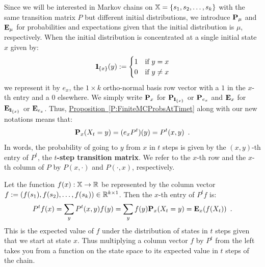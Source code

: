 Since we will be interested in Markov chains on $\mathbb{X} =\{s_1,s_2,\ldots,s_k\}$ with the same transition matrix $P$ but different initial distributions, we introduce $\mathbf{P}_{\mu}$ and $\mathbf{E}_{\mu}$ for probabilities and expectations  given that the initial distribution is $\mu$, respectively.  When the initial distribution is concentrated at a single initial state $x$ given by:
$${1}\mspace{-11 mu}{1}_{\{x\}}(y) := \begin{cases} 1 & \text{if } y=x\\ 0 & \text{if } y \neq x \end{cases}$$ 
we represent it by $e_x$, the $1 \times k$ ortho-normal basis row vector with a $1$ in the $x$-th entry and a $0$ elsewhere.  
We simply write $\mathbf{P}_x$ for $\mathbf{P}_{{1}\mspace{-11 mu}{1}_{\{x\}}}$ or $\mathbf{P}_{e_x}$ and $\mathbf{E}_x$ for $\mathbf{E}_{{1}\mspace{-11 mu}{1}_{\{x\}}}$ or $\mathbf{E}_{e_x}$.  Thus, \hyperref[P:FiniteMCProbsAtTimet]{Proposition~\ref*{P:FiniteMCProbsAtTimet}} along with our new notations means that:
\[
\mathbf{P}_x (X_t = y)  = (e_x P^t)(y) = P^t(x,y) \enspace .
\]
In words, the probability of going to $y$ from $x$ in $t$ steps is given by the $(x,y)$-th entry of $P^t$, the {\bf $t$-step transition matrix}.  We refer to the $x$-th row and the $x$-th column of $P$ by $P(x,\cdot)$ and $P(\cdot,x)$, respectively.

Let the function $f(x): \mathbb{X}\to \mathbb{R}$ be represented by the column vector $f := (f(s_1),f(s_2),\ldots,f(s_k)) \in \mathbb{R}^{k \times 1}$.  Then the $x$-th entry of $P^t f$ is:
\[
P^t f(x) = \sum_{y} P^t(x,y) f(y) = \sum_{y} f(y) \mathbf{P}_x (X_t = y) = \mathbf{E}_x (f(X_t)) \enspace .
\] 
This is the expected value of $f$ under the distribution of states in $t$ steps given that we start at state $x$.  
Thus multiplying a column vector $f$ by $P^t$ from the left takes you from a function on the state space to its expected value in $t$ steps of the chain. 

